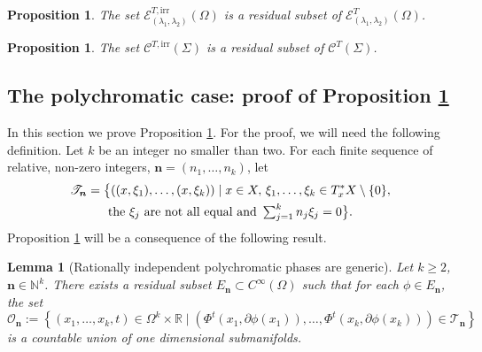 \documentclass[10pt]{amsart}
\let\mathcal\mathscr
\let\sep\mid
\newcommand{\irr}{\mathrm{irr}}
\theoremstyle{plain}
\newtheorem{lemma}[theorem]{Lemma}
\newtheorem{proposition}[theorem]{Proposition}
\theoremstyle{definition}
\newcommand{\N}{\mathbb{N}}
\newcommand{\R}{\mathbb{R}}
\def\calT{\mathcal{T}}
\begin{document}
\begin{proposition}\label{prop:polychrom_conclusion}
The set $\mathcal{E}^{T,\irr}_{(\lambda_1,\lambda_2)}(\Omega)$ is a residual subset of $\mathcal{E}^{T}_{(\lambda_1,\lambda_2)}(\Omega)$.
\end{proposition}

\begin{proposition}\label{prop:monochrom_conclusion}
The set $\mathcal{C}^{T,\irr}(\Sigma)$ is a residual subset of $\mathcal{C}^{T}(\Sigma)$.
\end{proposition}

\subsection{The polychromatic case: proof of Proposition \ref{prop:polychrom_conclusion}}\label{subsec:poly}

In this section we prove Proposition \ref{prop:polychrom_conclusion}. For the proof, we will need the following definition. Let $k$ be an integer no smaller than two. For each finite sequence of relative, non-zero integers, $\boldsymbol{n}=(n_1,\dots,n_k)$, let
\begin{multline*}
\calT_{\boldsymbol{n}}=\bigl{\{}((x,\xi_1),\dots,(x,\xi_k))\sep x\in X,\, \xi_1,\dots,\xi_k\in T^*_xX\setminus\{0\},\\
\text{the $\xi_j$ are not all equal and } \textstyle\sum_{j=1}^kn_j\xi_j=0\bigr{\}}.
\end{multline*}
Proposition \ref{prop:polychrom_conclusion} will be a consequence of the following result.

\begin{lemma}[Rationally independent polychromatic phases are generic]\label{lem:polychrom_irr}
Let $k\geq 2$, $\boldsymbol{n}\in \N^k$.
There exists a residual subset $E_{\boldsymbol{n}}\subset C^\infty(\Omega)$ such that for each $\phi\in E_{\boldsymbol{n}}$,
the set
\[
\mathcal{O}_{\boldsymbol{n}} := \left\{ (x_1,\dots,x_k,t) \in \Omega^k\times \R \sep (\Phi^{t}(x_1,\partial \phi(x_1)), \dots, \Phi^{t}(x_k,\partial \phi(x_k)))\in\calT_{\boldsymbol{n}} \right\}
\]
is a countable union of one dimensional submanifolds.
\end{lemma}
\end{document}
